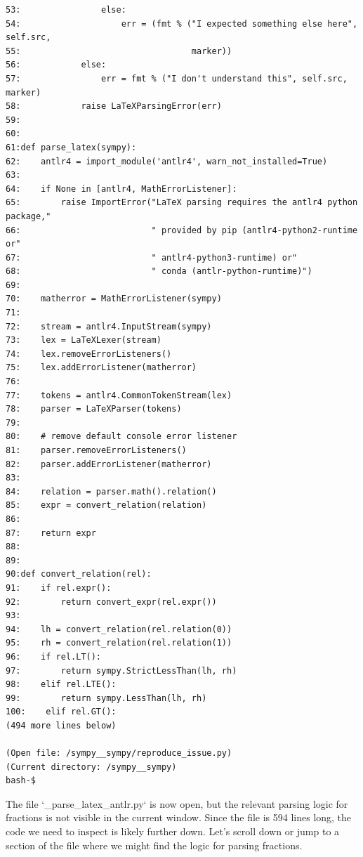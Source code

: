{\begin{observationbox}
\begin{Verbatim}[breaklines=true, breakanywhere=true]
53:                else:
54:                    err = (fmt % ("I expected something else here", self.src,
55:                                  marker))
56:            else:
57:                err = fmt % ("I don't understand this", self.src, marker)
58:            raise LaTeXParsingError(err)
59:
60:
61:def parse_latex(sympy):
62:    antlr4 = import_module('antlr4', warn_not_installed=True)
63:
64:    if None in [antlr4, MathErrorListener]:
65:        raise ImportError("LaTeX parsing requires the antlr4 python package,"
66:                          " provided by pip (antlr4-python2-runtime or"
67:                          " antlr4-python3-runtime) or"
68:                          " conda (antlr-python-runtime)")
69:
70:    matherror = MathErrorListener(sympy)
71:
72:    stream = antlr4.InputStream(sympy)
73:    lex = LaTeXLexer(stream)
74:    lex.removeErrorListeners()
75:    lex.addErrorListener(matherror)
76:
77:    tokens = antlr4.CommonTokenStream(lex)
78:    parser = LaTeXParser(tokens)
79:
80:    # remove default console error listener
81:    parser.removeErrorListeners()
82:    parser.addErrorListener(matherror)
83:
84:    relation = parser.math().relation()
85:    expr = convert_relation(relation)
86:
87:    return expr
88:
89:
90:def convert_relation(rel):
91:    if rel.expr():
92:        return convert_expr(rel.expr())
93:
94:    lh = convert_relation(rel.relation(0))
95:    rh = convert_relation(rel.relation(1))
96:    if rel.LT():
97:        return sympy.StrictLessThan(lh, rh)
98:    elif rel.LTE():
99:        return sympy.LessThan(lh, rh)
100:    elif rel.GT():
(494 more lines below)

(Open file: /sympy__sympy/reproduce_issue.py)
(Current directory: /sympy__sympy)
bash-$
\end{Verbatim}
\end{observationbox}
\begin{agentbox}
The file `\_parse\_latex\_antlr.py` is now open, but the relevant parsing logic for fractions is not visible in the current window. Since the file is 594 lines long, the code we need to inspect is likely further down. Let's scroll down or jump to a section of the file where we might find the logic for parsing fractions.


\end{agentbox}}
